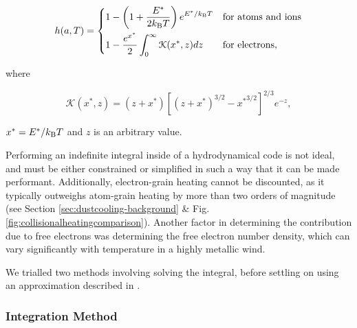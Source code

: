 \begin{equation}
  \label{eq:heintegral}
  h(a,T) =
  \begin{dcases}
    1 - \left(1 + \frac{E^*}{2k_\text{B} T}\right) e^{E^*/k_\text{B}T} & \text{for atoms and ions}\\
    1 - \frac{e^{x^*}}{2} \int^\infty_0 \mathcal{K}(x^*,z) dz & \text{for electrons} , 
  \end{dcases}
\end{equation}

\noindent
where

\begin{equation}
  \mathcal{K}(x^*,z) = (z + x^*) \left[ (z + x^*)^{3/2} - {x^*}^{3/2} \right]^{2/3} e^{-z} , 
\end{equation}

\noindent
$x^* = E^* / k_\text{B} T$ and $z$ is an arbitrary value.

Performing an indefinite integral inside of a hydrodynamical code is not ideal, and must be either constrained or simplified in such a way that it can be made performant.
Additionally, electron-grain heating cannot be discounted, as it typically outweighs atom-grain heating by more than two orders of magnitude (see Section \ref{sec:dustcooling-background} \& Fig. \ref{fig:collisionalheatingcomparison}).
Another factor in determining the contribution due to free electrons was determining the free electron number density, which can vary significantly with temperature in a highly metallic wind.

We trialled two methods involving solving the integral, before settling on using an approximation described in \textcite{dwek_infrared_1981}.

\subsubsection{Integration Method}

